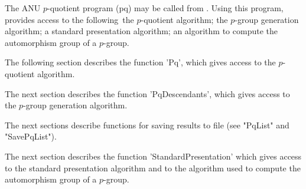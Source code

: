 
The ANU $p$-quotient program (pq) may  be called from {\GAP}.  Using this
program,  {\GAP}  provides access to   the  following\:\ the $p$-quotient
algorithm;  the $p$-group  generation algorithm; a  standard presentation
algorithm; an algorithm to compute the automorphism group of a $p$-group.

The  following section describes the function 'Pq', which gives access to
the $p$-quotient algorithm.

The next section  describes  the  function 'PqDescendants',  which  gives
access to the $p$-group generation algorithm.

The next sections describe  functions for  saving  results  to  file (see
"PqList" and "SavePqList").

The  next  section describes  the  function 'StandardPresentation'  which
gives access to the standard presentation algorithm and to the  algorithm
used to compute the automorphism group of a $p$-group.

